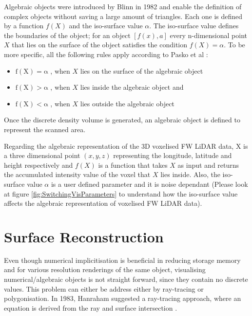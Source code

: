 \documentclass{subfiles}
\begin{document}
\par Algebraic objects were introduced by Blinn in 1982 \cite{Blinn1982} and enable the definition of complex objects without saving a large amount of triangles. Each one is defined by a function $ \mathit{f(X)} $ and the iso-surface value $\alpha$. The iso-surface value defines the boundaries of the object; for an object $ [f(x),a]$ every n-dimensional point $ \mathit{X} $  that lies on the surface of the object satisfies the condition $ \mathit{f(X)=\alpha }  $. To be more specific, all the following rules apply according to Pasko et al \cite{Pasko1994}: 
\begin{itemize}
	\item $	\mathrm{f(X) = \alpha }$ , when $X$ lies on the surface of the algebraic object
	\item $	\mathrm{f(X) > \alpha }$ , when $X$ lies inside the algebraic object and
	\item $	\mathrm{f(X) < \alpha }$ , when $X$ lies outside the algebraic object	 
\end{itemize}

\par Once the discrete density volume is generated, an algebraic object is defined to represent the scanned area. 

\par Regarding the algebraic representation of the 3D voxelised FW LiDAR data, X is a three dimensional point $\mathit{(x, y, z) }$ representing the longitude, latitude and height respectively and ${f(X)}$ is a function that takes  $\mathit{X}$ as input and returns the accumulated intensity value of the voxel that  $\mathit{X}$ lies inside. Also, the iso-surface value $\mathit{\alpha }$ is a user defined parameter and it is noise dependant (Please look at figure \ref{fig:SwitchingVisParameters} to understand how the iso-surface value affects the algebraic representation of voxelised FW LiDAR data). 




\section {Surface Reconstruction}\label{sec:SurfaceReconstruction}
\par Even though numerical implicitisation is beneficial in reducing storage memory and for various resolution renderings of the same object, visualising numerical/algebraic objects is not straight forward, since they contain no discrete values. This problem can either be address either by ray-tracing or polygonisation. In 1983, Hanraham suggested a ray-tracing approach, where an equation is derived from the ray and surface intersection \cite{Hanrahan1983}.  
\end{document}
